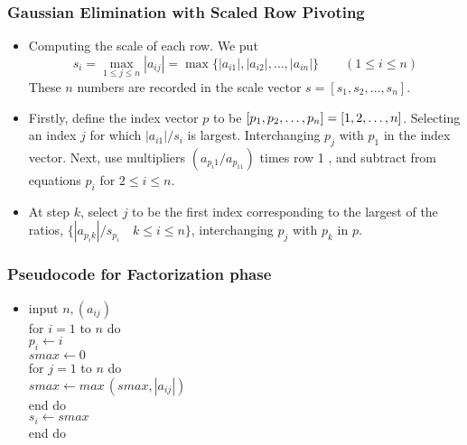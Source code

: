\documentclass[notheorems,mathserif,table,compress]{beamer}  %
\begin{document}
\begin{frame}
\frametitle{Gaussian Elimination with Scaled Row Pivoting} 
\begin{itemize}
\item Computing the \textsf{scale} of each row. We put
\begin{displaymath}
s_i=\max_{1\leq j\leq n}|a_{ij}|=\max\{|a_{i1}|,|a_{i2}|, \ldots, |a_{in}|\} \qquad (1\leq i\leq n)
\end{displaymath} 
These $n$ numbers are recorded in the scale vector $s=[s_1, s_2, \ldots, s_n]$.
\item Firstly, define the index vector $p$ to be $[p_1, p_2, \ldots, p_n]=\newline[1, 2, \ldots, n]$. Selecting an index $j$ for which $|a_{i1}|/s_i$ is largest. Interchanging $p_j$ with $p_1$ in the index vector. Next, use multipliers $(a_{p_i1}/a_{p_11})$ times row 1 , and subtract from equations $p_i$ for $2\leq i\leq n$.
\item At step $k$, select $j$ to be the first index corresponding to the largest of the ratios, $\{|a_{p_ik}|/s_{p_i}\quad k\leq i\leq n\}$, interchanging $p_j$ with $p_k$ in $p$.
\end{itemize}
\end{frame}

\begin{frame}
\frametitle{Pseudocode for Factorization phase} 
\begin{itemize}
\item 
\textsf{input} $n,(a_{ij})$\\
\textsf{for} $i=1$ \textsf{to} $n$ \textsf{do}\\
$p_i\leftarrow i$\\
$smax\leftarrow 0$\\
for $j=1$ to $n$ do\\
$smax\leftarrow max\,(smax, |a_{ij}|)$\\
\textsf{end do}\\
$s_i\leftarrow smax$\\
\textsf{end do}\\
\end{itemize}
\end{frame}
\end{document}
